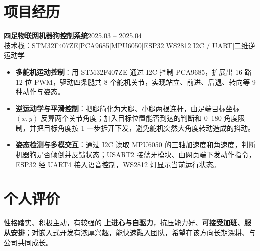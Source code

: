 \documentclass[10pt,a4paper]{article}
\newcommand{\projectblock}[3]{%
    {\bfseries\color{darktext}#1}\hfill{\color{graytext}#2}\\%
    {\small\color{graytext}#3}%
    \vspace{0.15em}%
}
\begin{document}
\section{\faProjectDiagram\hspace{0.4em}项目经历}

\projectblock{四足物联网机器狗控制系统}{2025.03 -- 2025.04}{技术栈：STM32F407ZE\hspace{0.3em}|\hspace{0.3em}PCA9685\hspace{0.3em}|\hspace{0.3em}MPU6050\hspace{0.3em}|\hspace{0.3em}ESP32\hspace{0.3em}|\hspace{0.3em}WS2812\hspace{0.3em}|\hspace{0.3em}I2C / UART\hspace{0.3em}|\hspace{0.3em}二维逆运动学}

\begin{itemize}[leftmargin=1.5em, itemsep=1pt, parsep=0pt, topsep=2pt]
    \item \textbf{多舵机运动控制}：用 STM32F407ZE 通过 I2C 控制 PCA9685，扩展出 16 路 12 位 PWM，驱动四条腿共 8 个舵机关节，实现站立、前进、后退、转向等 9 种动作与姿态。
    \item \textbf{逆运动学与平滑控制}：把腿简化为大腿、小腿两根连杆，由足端目标坐标 $(x, y)$ 反算两个关节角度；加入目标位置能否到达的判断和 0\textdegree--180\textdegree{} 角度限制，并把目标角度按 1\textdegree{} 一步拆开下发，避免舵机突然大角度转动造成的抖动。
    \item \textbf{姿态检测与多模交互}：通过 I2C 读取 MPU6050 的三轴加速度和角速度，判断机器狗是否倾倒并反馈状态；USART2 接蓝牙模块、由网页端下发动作指令，ESP32 经 UART4 接入语音控制，WS2812 灯显示当前运行状态。
\end{itemize}

\vspace{0.15em}

\section{\faUser\hspace{0.4em}个人评价}

性格踏实、积极主动，有较强的 \textbf{上进心与自驱力}，抗压能力好、\textbf{可接受加班、服从安排}；对嵌入式开发有浓厚兴趣，能快速融入团队，希望在该方向长期深耕、与公司共同成长。
\end{document}
